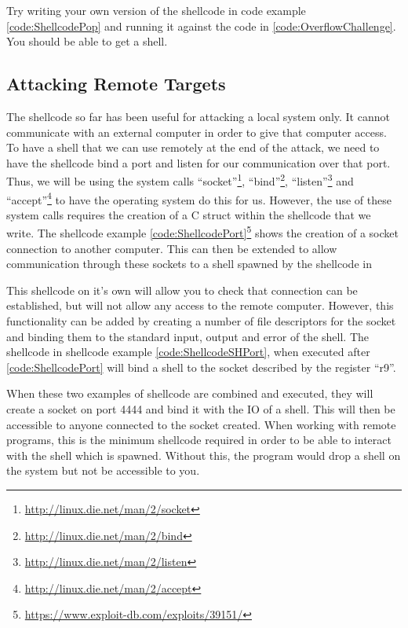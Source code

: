 \documentclass[a4paper,11pt]{report}
\begin{document}
			Try writing your own version of the shellcode in code example \ref{code:ShellcodePop} and running it against the code in \ref{code:OverflowChallenge}. You should be able to get a shell. 

			\subsection{Attacking Remote Targets}
				The shellcode so far has been useful for attacking a local system only. It cannot communicate with an external computer in order to give that computer access. 
				To have a shell that we can use remotely at the end of the attack, we need to have the shellcode bind a port and listen for our communication over that port. 
				Thus, we will be using the system calls ``socket''\footnote{\url{http://linux.die.net/man/2/socket}}, 
				``bind''\footnote{\url{http://linux.die.net/man/2/bind}}, 
				``listen''\footnote{\url{http://linux.die.net/man/2/listen}} and 
				``accept''\footnote{\url{http://linux.die.net/man/2/accept}} to have the operating system do this for us. 
				However, the use of these system calls requires the creation of a C struct within the shellcode that we write. 
				The shellcode example \ref{code:ShellcodePort}\footnote{\url{https://www.exploit-db.com/exploits/39151/}} shows the creation of a socket connection to another computer. 
				This can then be extended to allow communication through these sockets to a shell spawned by the shellcode in %
				\begin{code}
					Assembler}]{./ShellcodePort.asm}
					\caption{Shellcode to bind a shell to a port}
					\label{code:ShellcodePort}
				\end{code}
				This shellcode on it's own will allow you to check that connection can be established, but will not allow any access to the remote computer. 
				However, this functionality can be added by creating a number of file descriptors for the socket and binding them to the standard input, output and error of the shell. 
				The shellcode in shellcode example \ref{code:ShellcodeSHPort}, when executed after \ref{code:ShellcodePort} will bind a shell to the socket described by the register ``r9''. 
				\begin{code}
					Assembler}]{./ShellcodeSHPort.asm}
					\caption{Shellcode to bind a shell to a socket}
					\label{code:ShellcodeSHPort}
				\end{code}
				When these two examples of shellcode are combined and executed, they will create a socket on port 4444 and bind it with the IO of a shell. 
				This will then be accessible to anyone connected to the socket created. 
				When working with remote programs, this is the minimum shellcode required in order to be able to interact with the shell which is spawned. 
				Without this, the program would drop a shell on the system but not be accessible to you. 
				
\end{document}
